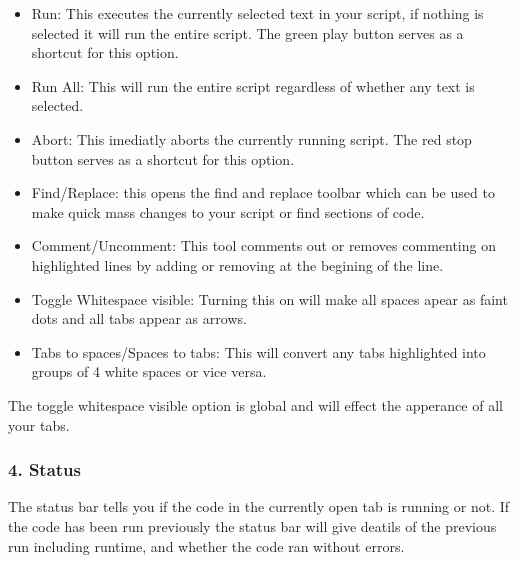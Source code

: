\documentclass[letterpaper,10pt,english,openany]{sphinxmanual}
\let\sphinxpxdimen\pdfpxdimen\else\newdimen\sphinxpxdimen
\begin{document}
\begin{figure}[H]
\centering

\noindent\sphinxincludegraphics[width=250\sphinxpxdimen]{{Workbench_script_options}.png}
\end{figure}
\begin{itemize}
\item {} 
Run: This executes the currently selected text in your script, if nothing is selected it will run the entire script. The green play button serves as a shortcut for this option.

\item {} 
Run All: This will run the entire script regardless of whether any text is selected.

\item {} 
Abort: This imediatly aborts the currently running script. The red stop button serves as a shortcut for this option.

\item {} 
Find/Replace: this opens the find and replace toolbar which can be used to make quick mass changes to your script or find sections of code.

\item {} 
Comment/Uncomment: This tool comments out or removes commenting on highlighted lines by adding or removing \sphinxcode{\sphinxupquote{\#}} at the begining of the line.

\item {} 
Toggle Whitespace visible: Turning this on will make all spaces apear as faint dots and all tabs appear as arrows.

\item {} 
Tabs to spaces/Spaces to tabs: This will convert any tabs highlighted into groups of 4 white spaces or vice versa.

\end{itemize}

The toggle whitespace visible option is global and will effect the apperance of all your tabs.


\subsubsection{4. Status}
\label{\detokenize{mantid_basic_course/using_workbench/03_Working_with_Python_in_Workbench:status}}
The status bar tells you if the code in the currently open tab is running or not. If the code has been run previously the status bar will give deatils of the previous run including
runtime, and whether the code ran without errors.
\end{document}
